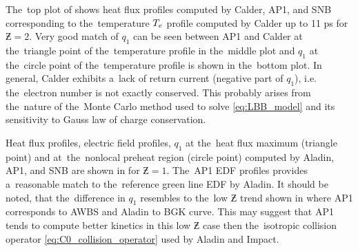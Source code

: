 The~top plot of  shows heat flux profiles
computed by Calder, AP1, and SNB corresponding to the~temperature $T_e$ profile 
computed by Calder up to 11 ps for $\Zbar = 2$. 
Very good match of $q_1$ can be seen between 
AP1 and Calder at the~triangle point of the~temperature profile in the~middle 
plot and $q_1$ at the~circle point of the~temperature profile is shown 
in the~bottom plot. 
In general, Calder exhibits a~lack of 
return current (negative part of $q_1$), i.e. the~electron number is not 
exactly conserved. This probably arises from the~nature of the~Monte Carlo 
method used to solve \eqref{eq:LBB_model} and its sensitivity to Gauss law
of charge conservation.
 
Heat flux profiles, electric field profiles, $q_1$ at the~heat flux maximum 
(triangle point) and at~the~nonlocal preheat region (circle point) 
computed by Aladin, AP1, and SNB are shown in  
for $\Zbar = 1$. The~AP1 EDF profiles provides a~reasonable match to 
the~reference green line EDF by Aladin. It should be noted, 
that the~difference in $q_1$ resembles to the~low $\Zbar$ trend
shown in  where AP1 corresponds to AWBS and Aladin to
BGK curve. This may suggest that AP1 tends 
to compute better kinetics in this low $\Zbar$ case then 
the~isotropic collision operator
\eqref{eq:C0_collision_operator} used by Aladin and Impact.


